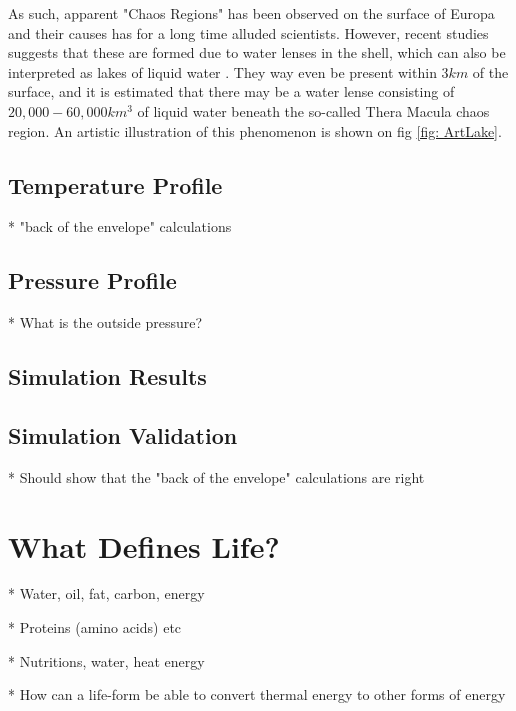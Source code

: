 As such, apparent "Chaos Regions" has been observed on the surface of Europa and their causes has for a long time alluded scientists. However, recent studies suggests that these are formed due to water lenses in the shell, which can also be interpreted as lakes of liquid water \cite{IceLakes}. They way even be present within $3km$ of the surface, and it is estimated that there may be a water lense consisting of $20,000 - 60,000km^3$ of liquid water beneath the so-called Thera Macula chaos region. An artistic illustration of this phenomenon is shown on fig \ref{fig: ArtLake}.

\subsection{Temperature Profile}

* "back of the envelope" calculations

\subsection{Pressure Profile}

* What is the outside pressure?

\subsection{Simulation Results}

\subsection{Simulation Validation}

* Should show that the "back of the envelope" calculations are right

\section{What Defines Life?} %

* Water, oil, fat, carbon, energy

* Proteins (amino acids) etc

* Nutritions, water, heat energy

* How can a life-form be able to convert thermal energy to other forms of energy


